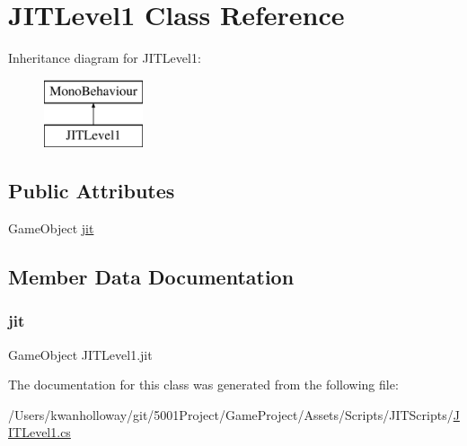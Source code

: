 \hypertarget{class_j_i_t_level1}{}\section{J\+I\+T\+Level1 Class Reference}
\label{class_j_i_t_level1}
Inheritance diagram for J\+I\+T\+Level1\+:\begin{figure}[H]
\begin{center}
\leavevmode
\includegraphics[height=2.000000cm]{class_j_i_t_level1}
\end{center}
\end{figure}
\subsection*{Public Attributes}
\begin{DoxyCompactItemize}
\item 
Game\+Object \hyperlink{class_j_i_t_level1_a39d30f1b60aeda6da0939f83a45c6a72}{jit}
\end{DoxyCompactItemize}


\subsection{Member Data Documentation}
\mbox{\label{class_j_i_t_level1_a39d30f1b60aeda6da0939f83a45c6a72}} 
\subsubsection{\texorpdfstring{jit}{jit}}
{\footnotesize\ttfamily Game\+Object J\+I\+T\+Level1.\+jit}



The documentation for this class was generated from the following file\+:\begin{DoxyCompactItemize}
\item 
/\+Users/kwanholloway/git/5001\+Project/\+Game\+Project/\+Assets/\+Scripts/\+J\+I\+T\+Scripts/\hyperlink{_j_i_t_level1_8cs}{J\+I\+T\+Level1.\+cs}\end{DoxyCompactItemize}
